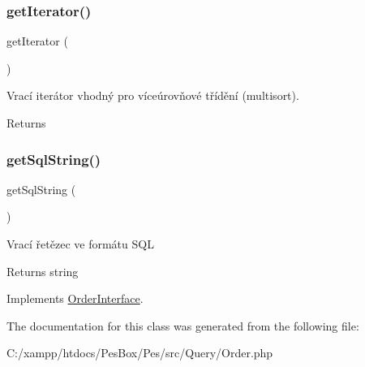 \subsubsection{\texorpdfstring{get\+Iterator()}{getIterator()}}
{\footnotesize\ttfamily get\+Iterator (\begin{DoxyParamCaption}{ }\end{DoxyParamCaption})}

Vrací iterátor vhodný pro víceúrovňové třídění (multisort). \begin{DoxyReturn}{Returns}

\end{DoxyReturn}
\mbox{\label{class_pes_1_1_query_1_1_order_a60f88a13135803a03975ff6555ece43f}} 
\subsubsection{\texorpdfstring{get\+Sql\+String()}{getSqlString()}}
{\footnotesize\ttfamily get\+Sql\+String (\begin{DoxyParamCaption}{ }\end{DoxyParamCaption})}

Vrací řetězec ve formátu S\+QL \begin{DoxyReturn}{Returns}
string 
\end{DoxyReturn}


Implements \mbox{\hyperlink{interface_pes_1_1_query_1_1_order_interface}{Order\+Interface}}.



The documentation for this class was generated from the following file\+:\begin{DoxyCompactItemize}
\item 
C\+:/xampp/htdocs/\+Pes\+Box/\+Pes/src/\+Query/Order.\+php\end{DoxyCompactItemize}

